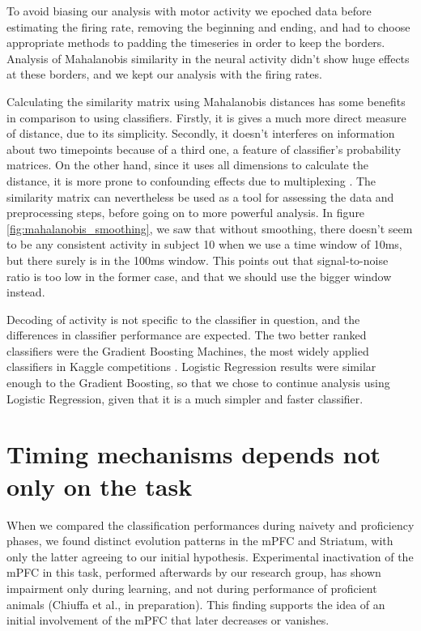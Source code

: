     To avoid biasing our analysis with motor activity we epoched data before estimating the firing rate, removing the beginning and ending, and had to choose appropriate methods to padding the timeseries in order to keep the borders. Analysis of Mahalanobis similarity in the neural activity didn't show huge effects at these borders, and we kept our analysis with the firing rates. 
    
    Calculating the similarity matrix using Mahalanobis distances has some benefits in comparison to using classifiers. Firstly, it is gives a much more direct measure of distance, due to its simplicity. Secondly, it doesn't interferes on information about two timepoints because of a third one, a feature of classifier's probability matrices. On the other hand, since it uses all dimensions to calculate the distance, it is more prone to confounding effects due to multiplexing \cite{gu2015oscillatory}. The similarity matrix can nevertheless be used as a tool for assessing the data and preprocessing steps, before going on to more powerful analysis. In figure \ref{fig:mahalanobis_smoothing}, we saw that without smoothing, there doesn't seem to be any consistent activity in subject 10 when we use a time window of 10ms, but there surely is in the 100ms window. This points out that signal-to-noise ratio is too low in the former case, and that we should use the bigger window instead. %
    
    Decoding of activity is not specific to the classifier in question, and the differences in classifier performance are expected. The two better ranked classifiers were the Gradient Boosting Machines, the most widely applied classifiers in Kaggle competitions \cite{chen2016xgboost, ke2017lightgbm}. Logistic Regression results were similar enough to the Gradient Boosting, so that we chose to continue analysis using Logistic Regression, given that it is a much simpler and faster classifier.

\section{Timing mechanisms depends not only on the task}
    When we compared the classification performances during naivety and proficiency phases, we found distinct evolution patterns in the mPFC and Striatum, with only the latter agreeing to our initial hypothesis. Experimental inactivation of the mPFC in this task, performed afterwards by our research group, has shown impairment only during learning, and not during performance of proficient animals (Chiuffa et al., in preparation). This finding supports the idea of an initial involvement of the mPFC that later decreases or vanishes. 
    
